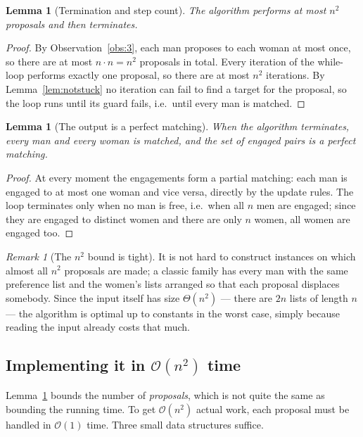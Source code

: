 \documentclass[11pt,a4paper]{article}
\theoremstyle{plain}
\newtheorem{lemma}[theorem]{Lemma}
\theoremstyle{definition}
\theoremstyle{remark}
\newtheorem{remark}[theorem]{Remark}
\newcommand{\bigoh}[1]{\mathcal{O}\!\left(#1\right)}
\begin{document}
\begin{lemma}[Termination and step count]\label{lem:steps}
The algorithm performs at most $n^2$ proposals and then terminates.
\end{lemma}

\begin{proof}
By Observation~\ref{obs:3}, each man proposes to each woman at most once, so
there are at most $n \cdot n = n^2$ proposals in total. Every iteration of the
while-loop performs exactly one proposal, so there are at most $n^2$
iterations. By Lemma~\ref{lem:notstuck} no iteration can fail to find a target
for the proposal, so the loop runs until its guard fails, i.e.\ until every
man is matched.
\end{proof}

\begin{lemma}[The output is a perfect matching]\label{lem:perfect}
When the algorithm terminates, every man and every woman is matched, and the
set of engaged pairs is a perfect matching.
\end{lemma}

\begin{proof}
At every moment the engagements form a partial matching: each man is engaged
to at most one woman and vice versa, directly by the update rules. The loop
terminates only when no man is free, i.e.\ when all $n$ men are engaged; since
they are engaged to distinct women and there are only $n$ women, all women are
engaged too.
\end{proof}

\begin{remark}[The $n^2$ bound is tight]
It is not hard to construct instances on which almost all $n^2$ proposals are
made; a classic family has every man with the same preference list and the
women's lists arranged so that each proposal displaces somebody. Since the
input itself has size $\Theta(n^2)$ --- there are $2n$ lists of length $n$ ---
the algorithm is optimal up to constants in the worst case, simply because
reading the input already costs that much.
\end{remark}

\subsection{Implementing it in $\bigoh{n^2}$ time}\label{sec:impl}

Lemma~\ref{lem:steps} bounds the number of \emph{proposals}, which is not
quite the same as bounding the running time. To get $\bigoh{n^2}$ actual
work, each proposal must be handled in $\bigoh{1}$ time. Three small data
structures suffice.
\end{document}
